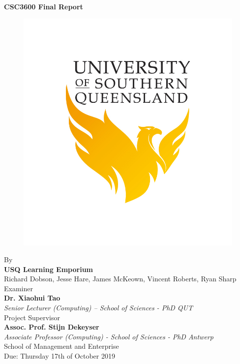 \documentclass[11pt]{article}
\begin{document}

    \begin{titlepage}
        \centering
        \vspace {1cm}
        \huge{\textbf{CSC3600 Final Report}} \\ [0.1cm]
        \begin{figure}[ht!]
            \centering
            \def\svgwidth{0.5\columnwidth}
            \includegraphics[scale={0.20}]{USQ.jpg}
        \end{figure}
        \vspace {0.5cm}
        \Large{By} \\
        \Large{\textbf{USQ Learning Emporium}} \\
        \Large{Richard Dobson, Jesse Hare, James McKeown, Vincent Roberts, Ryan Sharp} \\[0.50cm]
        \Large{Examiner} \\
        \Large{\textbf{Dr. Xiaohui Tao}} \\
        \Large{\textit{Senior Lecturer (Computing) – School of Sciences -
PhD QUT}} \\[0.50cm]
        \Large{Project Supervisor} \\
        \Large{\textbf{Assoc. Prof. Stijn Dekeyser}} \\
        \Large{\textit{Associate Professor (Computing) - School of Sciences - PhD Antwerp}} \\[0.50cm]
        \Large{School of Management and Enterprise} \\[0.50cm]

        \Large{Due: Thursday 17th of October 2019}
    \end{titlepage}
\end{document}
